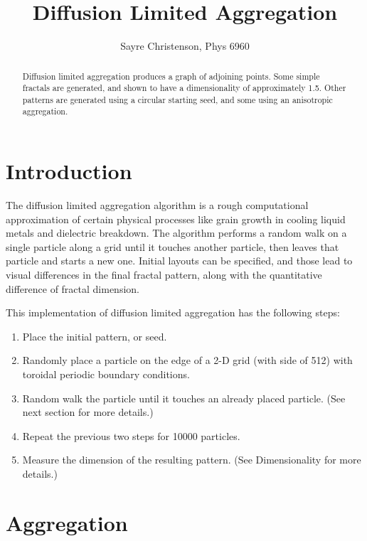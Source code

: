 \documentclass[12pt]{article}
\begin{document}
\title{Diffusion Limited Aggregation}
\date{}
\author{Sayre Christenson, Phys 6960}

\maketitle


\begin{abstract}

Diffusion limited aggregation produces a graph of adjoining points.
Some simple fractals are generated, and shown to have a dimensionality of approximately 1.5.
Other patterns are generated using a circular starting seed, and some using an anisotropic aggregation.

\end{abstract}

\section*{Introduction}

The diffusion limited aggregation algorithm is a rough computational approximation of certain physical processes like grain growth in cooling liquid metals and dielectric breakdown.
The algorithm performs a random walk on a single particle along a grid until it touches another particle, then leaves that particle and starts a new one.
Initial layouts can be specified, and those lead to visual differences in the final fractal pattern, along with the quantitative difference of fractal dimension.

This implementation of diffusion limited aggregation has the following steps:
\begin{enumerate}
\item{Place the initial pattern, or seed.}
\item{Randomly place a particle on the edge of a 2-D grid (with side of 512) with toroidal periodic boundary conditions.}
\item{Random walk the particle until it touches an already placed particle.  (See next section for more details.)}
\item{Repeat the previous two steps for 10000 particles.}
\item{Measure the dimension of the resulting pattern.  (See Dimensionality for more details.)}
\end{enumerate}


\section*{Aggregation}
\end{document}
